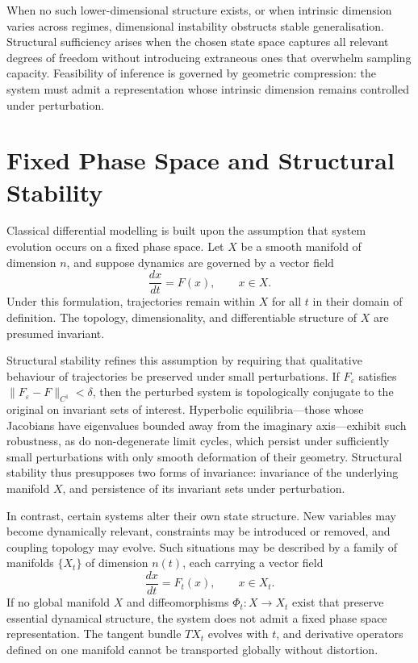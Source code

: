 \documentclass[12pt]{book}
\begin{document}
When no such lower-dimensional structure exists, or when intrinsic dimension
varies across regimes, dimensional instability obstructs stable generalisation.
Structural sufficiency arises when the chosen state space captures all relevant
degrees of freedom without introducing extraneous ones that overwhelm sampling
capacity. Feasibility of inference is governed by geometric compression: the
system must admit a representation whose intrinsic dimension remains controlled
under perturbation.

\section{Fixed Phase Space and Structural Stability}

Classical differential modelling is built upon the assumption that system
evolution occurs on a fixed phase space. Let $X$ be a smooth manifold of
dimension $n$, and suppose dynamics are governed by a vector field
\[
  \frac{dx}{dt} = F(x), \qquad x \in X.
\]
Under this formulation, trajectories remain within $X$ for all $t$ in their
domain of definition. The topology, dimensionality, and differentiable
structure of $X$ are presumed invariant.

Structural stability refines this assumption by requiring that qualitative
behaviour of trajectories be preserved under small perturbations. If $F_\varepsilon$
satisfies $\|F_\varepsilon - F\|_{C^1} < \delta$, then the perturbed system is
topologically conjugate to the original on invariant sets of interest.
Hyperbolic equilibria---those whose Jacobians have eigenvalues bounded away
from the imaginary axis---exhibit such robustness, as do non-degenerate limit
cycles, which persist under sufficiently small perturbations with only smooth
deformation of their geometry. Structural stability thus presupposes two forms
of invariance: invariance of the underlying manifold $X$, and persistence of
its invariant sets under perturbation.

In contrast, certain systems alter their own state structure. New variables may
become dynamically relevant, constraints may be introduced or removed, and
coupling topology may evolve. Such situations may be described by a family of
manifolds $\{X_t\}$ of dimension $n(t)$, each carrying a vector field
\[
  \frac{dx}{dt} = F_t(x), \qquad x \in X_t.
\]
If no global manifold $X$ and diffeomorphisms $\Phi_t : X \to X_t$ exist that
preserve essential dynamical structure, the system does not admit a fixed phase
space representation. The tangent bundle $TX_t$ evolves with $t$, and
derivative operators defined on one manifold cannot be transported globally
without distortion.
\end{document}
